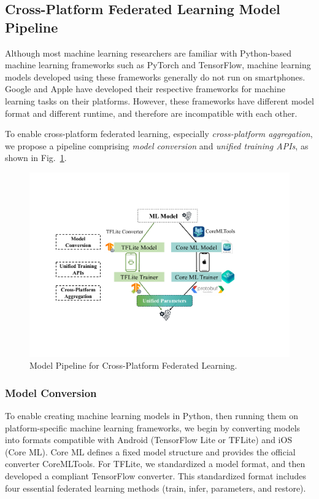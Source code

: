 \subsection{Cross-Platform Federated Learning Model Pipeline}
\label{sec:pipeline}

Although most machine learning researchers are familiar with Python-based
machine learning frameworks such as PyTorch and TensorFlow,
machine learning models developed using these frameworks generally do not run on
smartphones.
Google and Apple have developed their respective frameworks for machine learning
tasks on their platforms.
However, these frameworks have different model format and different runtime,
and therefore are incompatible with each other.

To enable cross-platform federated learning,
especially \textit{cross-platform aggregation},
we propose a pipeline comprising
\textit{model conversion} and
\textit{unified training APIs},
as shown in Fig.~\ref{fig:pipeline}.

\begin{figure}\begin{center}
    \includegraphics[width=\linewidth]{model_pipeline.pdf}
    \caption{\fedkit Model Pipeline for Cross-Platform Federated Learning.}
    \label{fig:pipeline}
\end{center}\end{figure}

\subsubsection{Model Conversion}
To enable creating machine learning models in Python,
then running them on platform-specific machine learning frameworks,
we begin by converting models into formats compatible with
Android (TensorFlow Lite or TFLite) and iOS (Core ML).
Core ML defines a fixed model structure and provides
the official converter CoreMLTools.
For TFLite, we standardized a model format, and then
developed a compliant TensorFlow converter.
This standardized format includes
four essential federated learning methods
(\textsf{train}, \textsf{infer}, \textsf{parameters},
and \textsf{restore}).

